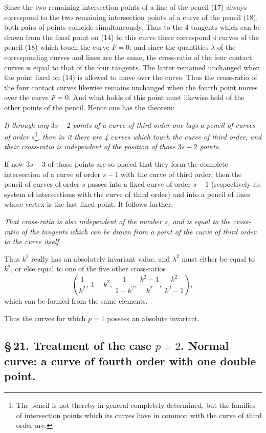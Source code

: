 \documentclass[10pt]{article}
\begin{document}
Since the two remaining intersection points of a line of the pencil (17) always correspond to the two remaining intersection points of a curve of the pencil (18), both pairs of points coincide simultaneously. Thus to the 4 tangents which can be drawn from the fixed point on (14) to this curve there correspond 4 curves of the pencil (18) which touch the curve \(F=0\); and since the quantities \(\lambda\) of the corresponding curves and lines are the same, the cross-ratio of the four contact curves is equal to that of the four tangents. The latter remained unchanged when the point fixed on (14) is allowed to move over the curve. Thus the cross-ratio of the four contact curves likewise remains unchanged when the fourth point moves over the curve \(F=0\). And what holds of this point must likewise hold of the other points of the pencil. Hence one has the theorem:

\emph{If through any \(3s-2\) points of a curve of third order one lays a pencil of curves of order \(s\)}\footnote{The pencil is not thereby in general completely determined, but the families of intersection points which its curves have in common with the curve of third order are.}\emph{, then in it there are 4 curves which touch the curve of third order, and their cross-ratio is independent of the position of those \(3s-2\) points.}

If now \(3s-3\) of those points are so placed that they form the complete intersection of a curve of order \(s-1\) with the curve of third order, then the pencil of curves of order \(s\) passes into a fixed curve of order \(s-1\) (respectively its system of intersections with the curve of third order) and into a pencil of lines whose vertex is the last fixed point. It follows further:

\emph{That cross-ratio is also independent of the number \(s\), and is equal to the cross-ratio of the tangents which can be drawn from a point of the curve of third order to the curve itself.}

Thus \(k^2\) really has an absolutely invariant value, and \(\lambda^2\) must either be equal to \(k^2\), or else equal to one of the five other cross-ratios
\[
\left(\frac1{k^2},\ 1-k^2,\ \frac1{1-k^2},\ \frac{k^2-1}{k^2},\ \frac{k^2}{k^2-1}\right),
\]
which can be formed from the same elements.

Thus the curves for which \(p=1\) possess an absolute invariant.

\subsection*{\S\,21. Treatment of the case \(p=2\). Normal curve: a curve of fourth order with one double point.}
\end{document}
